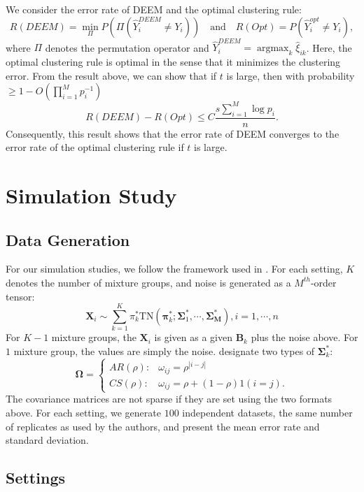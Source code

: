 \documentclass[11pt]{article}
\newcommand{\amax}{\operatorname*{argmax}}
\newcommand{\wh}{\widehat}
\begin{document}
We consider the error rate of DEEM and the optimal clustering rule:
$$
R(DEEM)= \min_{\Pi} P(\Pi(\wh Y_i^{DEEM} \neq Y_i)) \quad\text{and}\quad R(Opt)= P(\wh Y_i^{opt} \neq Y_i),
$$
where $\Pi$ denotes the permutation operator and $\wh Y_i^{DEEM}= \amax_k \wh\xi_{ik}$.
Here, the optimal clustering rule is optimal in the sense that it minimizes the clustering error.
From the result above, we can show that if $t$ is large, then with probability $\ge 1- O(\prod_{i=1}^M p_i^{-1})$
$$
R(DEEM) - R(Opt) \le C \frac{s\sum_{i=1}^M \log p_i}{n}.
$$
Consequently, this result shows that the error rate of DEEM converges to the error rate of the optimal clustering rule if $t$ is large.


\section{Simulation Study}

\subsection{Data Generation}

For our simulation studies, we follow the framework used in \cite{mai2022DEEM}. For each setting, $K$ denotes the number of mixture groups, and noise is generated as a $M^{th}$-order tensor:  
\begin{equation}
    \mathbf{X}_i \sim \sum_{k=1}^K \pi^*_k \mbox{TN} (\boldsymbol{\pi}^*_k; \boldsymbol{\Sigma}^*_1, \cdots, \boldsymbol{\Sigma^*_M}), i = 1, \cdots, n
\end{equation}
For $K-1$ mixture groups, the $\mathbf{X}_i$ is given as a given $\mathbf{B}_k$ plus the noise above. For $1$ mixture group, the values are simply the noise. \citeauthor{mai2022DEEM} designate two types of $\boldsymbol{\Sigma}^*_k$: 
\[  \boldsymbol{\Omega} =   \begin{cases}
     AR(\rho): & \omega_{ij} = \rho^{|i-j|} \\
    CS(\rho): & \omega_{ij} = \rho + (1-\rho) 1(i=j).
\end{cases}\]
The covariance matrices are not sparse if they are set using the two formats above. For each setting, we generate $100$ independent datasets, the same number of replicates as used by the authors, and present the mean error rate and standard deviation. 

\subsection{Settings}
\end{document}

